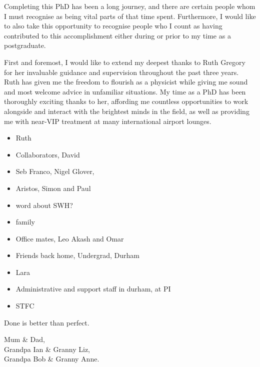 \documentclass[
twoside,
openright,
frontopenright
]{dmathesis}
\begin{document}
\begin{acknowledgements*}
  Completing this PhD has been a long journey, and there are certain people whom
  I must recognise as being vital parts of that time spent. Furthermore, I would
  like to also take this opportunity to recognise people who I count as having
  contributed to this accomplishment either during or prior to my time as a
  postgraduate.

  First and foremost, I would like to extend my deepest thanks to Ruth Gregory
  for her invaluable guidance and supervision throughout the past three
  years. Ruth has given me the freedom to flourish as a physicist while giving
  me sound and most welcome advice in unfamiliar situations. My time as a PhD
  has been thoroughly exciting thanks to her, affording me countless
  opportunities to work alongside and interact with the brightest minds in the
  field, as well as providing me with near-VIP treatment at many international
  airport lounges. 
  
  \begin{itemize}
  \item Ruth
  \item Collaborators, David
  \item Seb Franco, Nigel Glover,
  \item Aristos, Simon and Paul
  \item word about SWH?
  \item family
  \item Office mates, Leo Akash and Omar
  \item Friends back home, Undergrad, Durham
  \item Lara
  \item Administrative and support staff in durham, at PI
  \item STFC
  \end{itemize}
%
\end{acknowledgements*}

\begin{epigraph*}
%
  Done is better than perfect.
%
\end{epigraph*}

\begin{dedication*}
%
  Mum \& Dad,\\ Grandpa Ian \& Granny Liz,\\ Grandpa Bob \& Granny Anne.
%
\end{dedication*}
\end{document}

